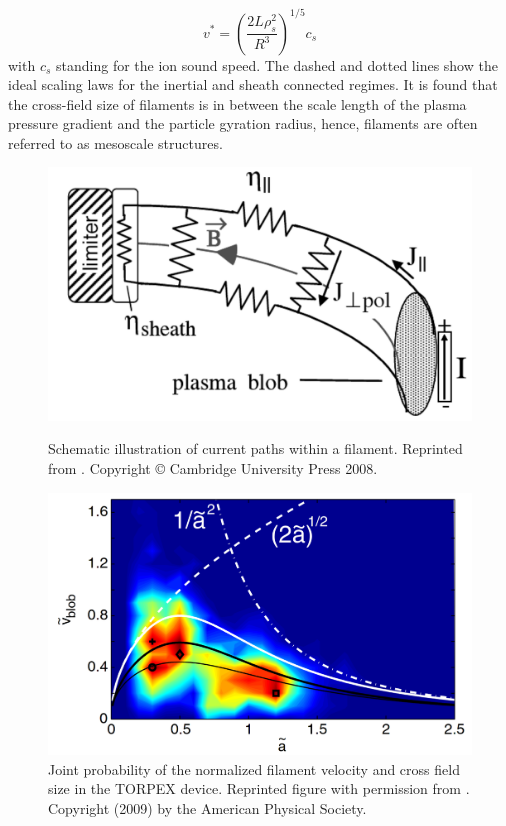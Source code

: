 \begin{equation}
	v^* = \left(\frac{2 L \rho_s^2}{R^3}\right)^{1/5} c_s
\end{equation} 
with $c_s$ standing for the ion sound speed.
The dashed and dotted lines show the ideal scaling laws for the inertial and sheath connected regimes. It is found that the cross-field size of filaments is in between the scale length of the plasma pressure gradient and the particle gyration radius, hence, filaments are often referred to as mesoscale structures.
\begin{figure}
	\centering
	\begin{minipage}{.48\linewidth}
		\includegraphics[width=\linewidth]{figures/krasheninnikov.png}
		\caption{Schematic illustration of current paths within a filament. Reprinted from \cite{krasheninnikov2008recent}. Copyright © Cambridge University Press 2008.}
		\label{Fig:krasheninnikov}
	\end{minipage}
	\hfill
	\begin{minipage}{.48\linewidth}
		\includegraphics[width=\linewidth]{figures/theiler.png}
		\caption{Joint probability of the normalized filament velocity and cross field size in the TORPEX device. Reprinted figure with permission from \cite{theiler2009cross}. Copyright (2009) by the American Physical Society.}
		\label{Fig:theiler}
	\end{minipage}
\end{figure}

